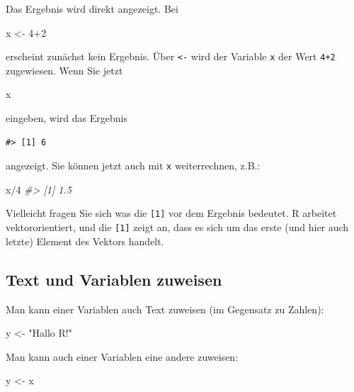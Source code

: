 \documentclass[12pt,ngerman,]{book}
\newenvironment{Shaded}{\begin{snugshade}}{\end{snugshade}}
\newcommand{\DecValTok}[1]{\textcolor[rgb]{0.00,0.00,0.81}{{#1}}}
\newcommand{\StringTok}[1]{\textcolor[rgb]{0.31,0.60,0.02}{{#1}}}
\newcommand{\CommentTok}[1]{\textcolor[rgb]{0.56,0.35,0.01}{\textit{{#1}}}}
\newcommand{\NormalTok}[1]{{#1}}
\renewenvironment{Shaded}{\begin{kframe}}{\end{kframe}}
\begin{document}
Das Ergebnis wird direkt angezeigt. Bei

\begin{Shaded}
\begin{Highlighting}[]
\NormalTok{x <-}\StringTok{ }\DecValTok{4+2} 
\end{Highlighting}
\end{Shaded}

erscheint zunächst kein Ergebnis. Über \texttt{\textless{}-} wird der
Variable \texttt{x} der Wert \texttt{4+2} zugewiesen. Wenn Sie jetzt

\begin{Shaded}
\begin{Highlighting}[]
\NormalTok{x }
\end{Highlighting}
\end{Shaded}

eingeben, wird das Ergebnis

\begin{verbatim}
#> [1] 6
\end{verbatim}

angezeigt. Sie können jetzt auch mit \texttt{x} weiterrechnen, z.B.:

\begin{Shaded}
\begin{Highlighting}[]
\NormalTok{x/}\DecValTok{4} 
\CommentTok{#> [1] 1.5}
\end{Highlighting}
\end{Shaded}

Vielleicht fragen Sie sich was die \texttt{{[}1{]}} vor dem Ergebnis
bedeutet. R arbeitet vektororientiert, und die \texttt{{[}1{]}} zeigt
an, dass es sich um das erste (und hier auch letzte) Element des Vektors
handelt.

\subsection{Text und Variablen
zuweisen}\label{text-und-variablen-zuweisen}

Man kann einer Variablen auch Text zuweisen (im Gegensatz zu Zahlen):

\begin{Shaded}
\begin{Highlighting}[]
\NormalTok{y <-}\StringTok{ "Hallo R!"}
\end{Highlighting}
\end{Shaded}

Man kann auch einer Variablen eine andere zuweisen:

\begin{Shaded}
\begin{Highlighting}[]
\NormalTok{y <-}\StringTok{ }\NormalTok{x}
\end{Highlighting}
\end{Shaded}
\end{document}
